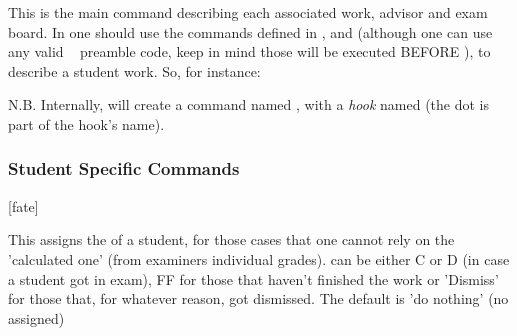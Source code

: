 \documentclass[dctools,english]{ufrgscca} %
\begin{document}
\begin{Macros}{\NewStudent}
	\begin{Syntax}%
	\end{Syntax}
	This is the main command describing each  associated work, advisor and exam board. In  one should use the commands defined in , and  (although one can use  any valid \LaTeXe~ preamble code, keep in mind those will be executed BEFORE \Macro{\begin{document}}{}), to describe a student work.
	So, for instance:
	\begin{stcode}[st=d.newstudent]
\end{stcode}


N.B. Internally, \Macro{\NewStudent}{} will create a command named \Macro{\studentname}{}, with a \emph{hook} named  (the dot is part of the hook's name).
\end{Macros}

\subsubsection{Student Specific Commands}\label{student-specific-commands}
\begin{Macros}{\studentFate}
	\begin{Syntax}%
		\Macro{\studentFate}[fate]{}
	\end{Syntax}
This assigns the  of a student, for those cases that one cannot rely on the 'calculated one' (from examiners individual grades).  can be either C or D (in case a student got in exam), FF for those that haven't finished the work or 'Dismiss' for those that, for whatever reason, got dismissed. The default is 'do nothing' (no  assigned)
\end{Macros}
\end{document}
